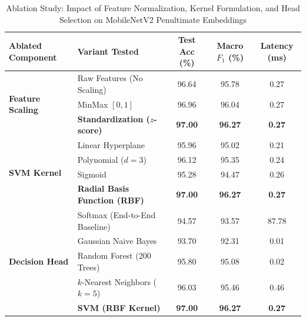 \begin{table}[htbp]
\caption{Ablation Study: Impact of Feature Normalization, Kernel Formulation, and Head Selection on MobileNetV2 Penultimate Embeddings}
\label{tab:ablation_study}
\centering
\footnotesize
\begin{tabular}{llccc}
\toprule
\textbf{Ablated Component} & \textbf{Variant Tested} & \textbf{Test Acc (\%)} & \textbf{Macro $F_1$ (\%)} & \textbf{Latency (ms)} \\
\midrule
\multirow{3}{*}{\textbf{Feature Scaling}} & Raw Features (No Scaling) & 96.64 & 95.78 & 0.27 \\
 & MinMax $[0, 1]$ & 96.96 & 96.04 & 0.27 \\
 & \textbf{Standardization ($z$-score)} & \textbf{97.00} & \textbf{96.27} & \textbf{0.27} \\
\midrule
\multirow{4}{*}{\textbf{SVM Kernel}} & Linear Hyperplane & 95.96 & 95.02 & 0.21 \\
 & Polynomial ($d=3$) & 96.12 & 95.35 & 0.24 \\
 & Sigmoid & 95.28 & 94.47 & 0.26 \\
 & \textbf{Radial Basis Function (RBF)} & \textbf{97.00} & \textbf{96.27} & \textbf{0.27} \\
\midrule
\multirow{5}{*}{\textbf{Decision Head}} & Softmax (End-to-End Baseline) & 94.57 & 93.57 & 87.78 \\
 & Gaussian Naive Bayes & 93.70 & 92.31 & 0.01 \\
 & Random Forest (200 Trees) & 95.80 & 95.08 & 0.02 \\
 & $k$-Nearest Neighbors ($k=5$) & 96.03 & 95.46 & 0.46 \\
 & \textbf{SVM (RBF Kernel)} & \textbf{97.00} & \textbf{96.27} & \textbf{0.27} \\
\bottomrule
\end{tabular}
\end{table}